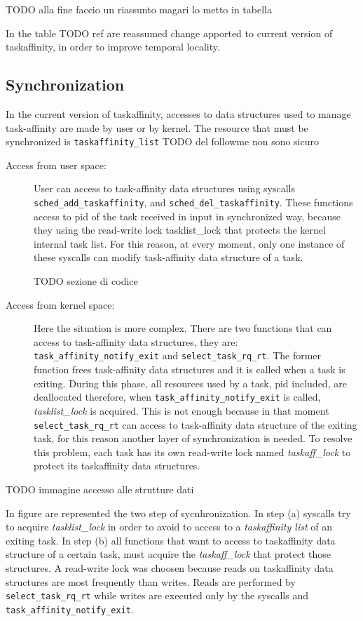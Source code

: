 TODO alla fine faccio un riassunto magari lo metto in tabella

In the table TODO ref are reassumed change apported to current version of taskaffinity, in order to improve temporal locality.

\subsection{Synchronization}

In the current version of taskaffinity, accesses to data structures used to manage task-affinity are made by user or by kernel. The resource that must be
synchronized is \texttt{taskaffinity\_list} TODO del followme non sono sicuro

\begin{description}

\item[Access from user space:] User can access to task-affinity data structures using syscalls \texttt{sched\_add\_taskaffinity}, and 
\texttt{sched\_del\_taskaffinity}. These functions access to pid of the task received in input in synchronized way, because they using the read-write lock
tasklist\_lock that protects the kernel internal task list. For this reason, at every moment, only one instance of these syscalls can modify task-affinity 
data structure of a task.

TODO sezione di codice

\item[Access from kernel space:] Here the situation is more complex. There are two functions that can access to task-affinity data structures, they are:
\texttt{task\_affinity\_notify\_exit} and \texttt{select\_task\_rq\_rt}. The former function frees task-affinity data structures and it is called when a 
task is exiting. During this phase, all resources used by a task, pid included, are deallocated therefore, when \texttt{task\_affinity\_notify\_exit} is 
called, \textit{tasklist\_lock} is acquired. This is not enough because in that moment \texttt{select\_task\_rq\_rt} can access to task-affinity data 
structure of the exiting task, for this reason another layer of synchronization is needed. To resolve this problem, each task has its own read-write lock 
named \textit{taskaff\_lock} to protect its taskaffinity data structures. 

\end{description}

TODO immagine accesso alle strutture dati

In figure are represented the two step of sycnhronization. In step (a) syscalls try to acquire \textit{tasklist\_lock} in order to avoid to access to a 
\textit{taskaffinity list} of an exiting task. In step (b) all functions that want to access to taskaffinity data structure of a certain task, must 
acquire the \textit{taskaff\_lock} that protect those structures. A read-write lock was choosen because reads on taskaffinity data structures are 
most frequently than writes. Reads are performed by \texttt{select\_task\_rq\_rt} while writes are executed only by the syscalls and 
\texttt{task\_affinity\_notify\_exit}.




